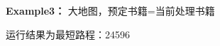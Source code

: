 \documentclass[withoutpreface,bwprint]{thesis-config}
\begin{document}
\par \textbf{Example3：} 大地图，预定书籍=当前处理书籍
\par 运行结果为最短路程：24596
\end{document}
